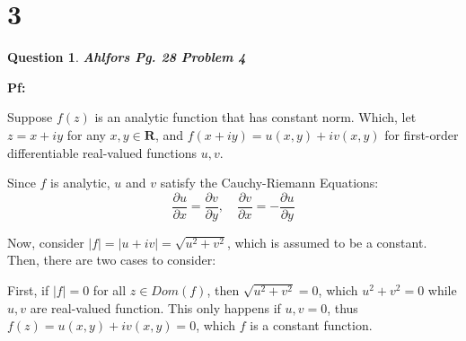 \documentclass{article}
\newtheorem{question}{Question}
\begin{document}
\break

\section*{3}
\begin{question}
    \textbf{Ahlfors Pg. 28 Problem 4
    }
\end{question}

\textbf{Pf:}

Suppose $f(z)$ is an analytic function that has constant norm. Which, let $z=x+iy$ for any $x,y\in\mathbf{R}$, and $f(x+iy) = u(x,y)+iv(x,y)$ for first-order differentiable real-valued functions $u, v$.

Since $f$ is analytic, $u$ and $v$ satisfy the Cauchy-Riemann Equations:
$$\frac{\partial u}{\partial x} = \frac{\partial v}{\partial y},\quad \frac{\partial v}{\partial x} = -\frac{\partial u}{\partial y}$$

\hfill

Now, consider $|f| = |u+iv| = \sqrt{u^2+v^2}$, which is assumed to be a constant. Then, there are two cases to consider:

First, if $|f|=0$ for all $z\in Dom(f)$, then $\sqrt{u^2+v^2} = 0$, which $u^2+v^2=0$ while $u,v$ are real-valued function. This only happens if $u,v=0$, thus $f(z)=u(x,y)+iv(x,y)=0$, which $f$ is a constant function.

\hfill
\end{document}

